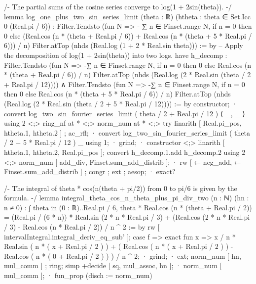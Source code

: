 /-
The partial sums of the cosine series converge to log(1 + 2sin(theta)).
-/
lemma log_one_plus_two_sin_series_limit (theta : ℝ) (htheta : theta ∈ Set.Icc 0 (Real.pi / 6)) :
  Filter.Tendsto (fun N => - ∑ n ∈ Finset.range N, if n = 0 then 0 else (Real.cos (n * (theta + Real.pi / 6)) + Real.cos (n * (theta + 5 * Real.pi / 6))) / n) Filter.atTop (nhds (Real.log (1 + 2 * Real.sin theta))) := by
    -- Apply the decomposition of log(1 + 2sin(theta)) into two logs.
    have h_decomp : Filter.Tendsto (fun N => -∑ n ∈ Finset.range N, if n = 0 then 0 else Real.cos (n * (theta + Real.pi / 6)) / n) Filter.atTop (nhds (Real.log (2 * Real.sin (theta / 2 + Real.pi / 12)))) ∧ Filter.Tendsto (fun N => -∑ n ∈ Finset.range N, if n = 0 then 0 else Real.cos (n * (theta + 5 * Real.pi / 6)) / n) Filter.atTop (nhds (Real.log (2 * Real.sin (theta / 2 + 5 * Real.pi / 12)))) := by
      constructor;
      · convert log_two_sin_fourier_series_limit ( theta / 2 + Real.pi / 12 ) ⟨ _, _ ⟩ using 2 <;> ring_nf at * <;> norm_num at * <;> try linarith [ Real.pi_pos, htheta.1, htheta.2 ] ;
        ac_rfl;
      · convert log_two_sin_fourier_series_limit ( theta / 2 + 5 * Real.pi / 12 ) _ using 1;
        · grind;
        · constructor <;> linarith [ htheta.1, htheta.2, Real.pi_pos ];
    convert h_decomp.1.add h_decomp.2 using 2 <;> norm_num [ add_div, Finset.sum_add_distrib ];
    · rw [ ← neg_add, ← Finset.sum_add_distrib ] ; congr ; ext ; aesop;
    · exact?

/-
The integral of theta * cos(n(theta + pi/2)) from 0 to pi/6 is given by the formula.
-/
lemma integral_theta_cos_n_theta_plus_pi_div_two (n : ℕ) (hn : n ≠ 0) :
  ∫ theta in (0 : ℝ)..Real.pi / 6, theta * Real.cos (n * (theta + Real.pi / 2)) =
  (Real.pi / (6 * n)) * Real.sin (2 * n * Real.pi / 3) + (Real.cos (2 * n * Real.pi / 3) - Real.cos (n * Real.pi / 2)) / n ^ 2 := by
    rw [ intervalIntegral.integral_deriv_eq_sub' ];
    case f => exact fun x => x / n * Real.sin ( n * ( x + Real.pi / 2 ) ) + ( Real.cos ( n * ( x + Real.pi / 2 ) ) - Real.cos ( n * ( 0 + Real.pi / 2 ) ) ) / n ^ 2;
    · grind;
    · ext; norm_num [ hn, mul_comm ] ; ring;
      simp +decide [ sq, mul_assoc, hn ];
    · norm_num [ mul_comm ];
    · fun_prop (disch := norm_num)


